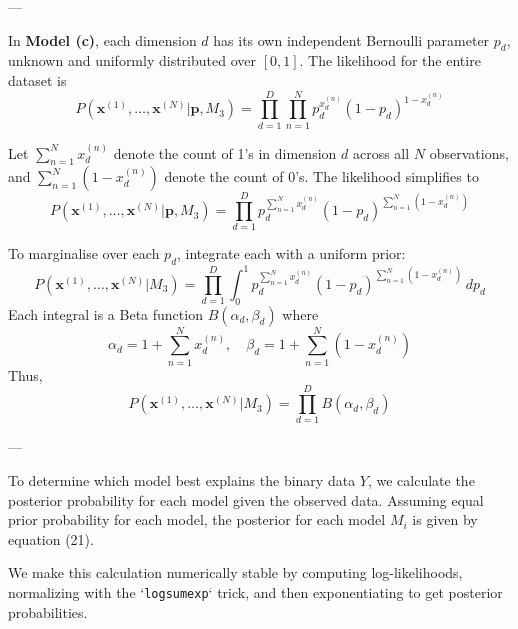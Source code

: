 \documentclass{article}
\begin{document}
    \noindent
    ---
    
    \noindent In \textbf{Model (c)}, each dimension \( d \) has its own independent Bernoulli parameter \( p_d \), unknown and uniformly distributed over \( [0, 1] \). The likelihood for the entire dataset is
    \begin{equation}
        P(\mathbf{x}^{(1)}, \dots, \mathbf{x}^{(N)} | \mathbf{p}, M_3) = \prod_{d=1}^{D} \prod_{n=1}^{N} p_d^{x_d^{(n)}} (1 - p_d)^{1 - x_d^{(n)}}
    \end{equation}
    
    \noindent Let \( \sum_{n=1}^N x_d^{(n)} \) denote the count of 1's in dimension \( d \) across all \( N \) observations, and \( \sum_{n=1}^N (1 - x_d^{(n)}) \) denote the count of 0's. The likelihood simplifies to
    \begin{equation}
        P(\mathbf{x}^{(1)}, \dots, \mathbf{x}^{(N)} | \mathbf{p}, M_3) = \prod_{d=1}^{D} p_d^{\sum_{n=1}^N x_d^{(n)}} (1 - p_d)^{\sum_{n=1}^N (1 - x_d^{(n)})}
    \end{equation}
    
    \noindent To marginalise over each \( p_d \), integrate each with a uniform prior:
    \begin{equation}
        P(\mathbf{x}^{(1)}, \dots, \mathbf{x}^{(N)} | M_3) = \prod_{d=1}^{D} \int_0^1 p_d^{\sum_{n=1}^N x_d^{(n)}} (1 - p_d)^{\sum_{n=1}^N (1 - x_d^{(n)})} \, dp_d
    \end{equation}
    Each integral is a Beta function \( B(\alpha_{d}, \beta_{d}) \) where
    \begin{equation}
        \alpha_{d} = 1 + \sum_{n=1}^N x_d^{(n)}, \quad \beta_{d} = 1 + \sum_{n=1}^N (1 - x_d^{(n)})
    \end{equation}
    Thus,
    \begin{equation}
        P(\mathbf{x}^{(1)}, \dots, \mathbf{x}^{(N)} | M_3) = \prod_{d=1}^{D} B(\alpha_{d}, \beta_{d})
    \end{equation}


    \noindent
    ---
    \vspace{10pt}
    
    \noindent To determine which model best explains the binary data \( Y \), we calculate the posterior probability for each model given the observed data. Assuming equal prior probability for each model, the posterior for each model \( M_i \) is given by equation (21).
    \vspace{10pt}
    
    \noindent We make this calculation numerically stable by computing log-likelihoods, normalizing with the `\texttt{logsumexp}` trick, and then exponentiating to get posterior probabilities.
    
\end{document}
